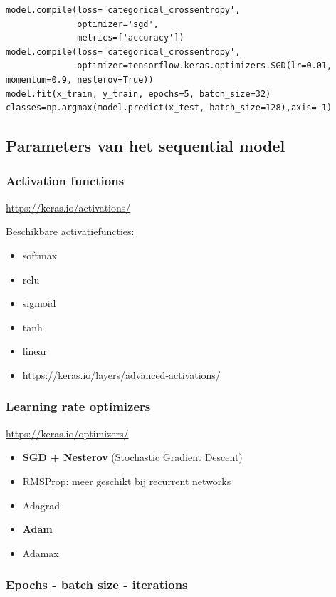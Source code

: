 \documentclass{article}
\begin{document}
\begin{verbatim}
model.compile(loss='categorical_crossentropy',
              optimizer='sgd',
              metrics=['accuracy'])
model.compile(loss='categorical_crossentropy',
              optimizer=tensorflow.keras.optimizers.SGD(lr=0.01, momentum=0.9, nesterov=True))
model.fit(x_train, y_train, epochs=5, batch_size=32)
classes=np.argmax(model.predict(x_test, batch_size=128),axis=-1)
\end{verbatim}

\subsection{Parameters van het sequential model}

\subsubsection{Activation functions}

\url{https://keras.io/activations/}

Beschikbare activatiefuncties:

\begin{itemize}
    \item softmax
    \item relu
    \item sigmoid
    \item tanh
    \item linear
    \item \url{https://keras.io/layers/advanced-activations/}
\end{itemize}

\subsubsection{Learning rate optimizers}

\url{https://keras.io/optimizers/}

\begin{itemize}
    \item \textbf{SGD + Nesterov} (Stochastic Gradient Descent)
    \item RMSProp: meer geschikt bij recurrent networks
    \item Adagrad
    \item \textbf{Adam}
    \item Adamax
\end{itemize}

\subsubsection{Epochs - batch size - iterations}
\end{document}
